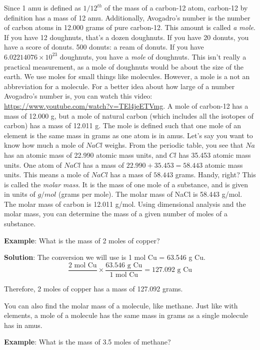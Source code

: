 Since 1 amu is defined as $1/12^{th}$ of the mass of a carbon-12 atom, carbon-12 
by definition has a mass of 12 amu. Additionally, Avogadro's number is the number 
of carbon atoms in 12.000 grams of pure carbon-12. This amount is called \textit{a
mole}. If you have 12 doughnuts, that's a dozen doughnuts. If you have 20 donuts, 
you have a score of donuts. 500 donuts: a ream of donuts. If you have $6.02214076 
\times 10^{23}$ doughnuts, you have a \textit{mole} of doughnuts. This isn't 
really a practical measurement, as a mole of doughnuts would be about the size of 
the earth. We use moles for small things like molecules. However, a mole is a not an abbreviation for a molecule. For a better 
idea about how large of a number Avogadro's number is, you can watch this video: 
\url{https://www.youtube.com/watch?v=TEl4jeETVmg}. 
A mole of carbon-12 has a mass of 12.000 g, but a mole of natural carbon (which
includes all the isotopes of carbon) has a mass of 12.011 g. The mole is defined 
such that one mole of an element is the same mass in grams as one atom is in amus.
Let's say you want to know how much a mole of $NaCl$ weighs. From the periodic 
table, you see that $Na$ has an atomic mass of 22.990 atomic mass units, and $Cl$ 
has 35.453 atomic mass units. One atom of $NaCl$ has a mass of $22.990 + 35.453 = 
58.443$ atomic mass units. This means a mole of $NaCl$ has a mass of $58.443$ 
grams. Handy, right? This is called the \textit{molar mass}. It is the mass of one
mole of a substance, and is given in units of $g/mol$ (grams per mole). The molar 
mass of NaCl is 58.443 g/mol. The molar mass of carbon is 12.011 g/mol. Using 
dimensional analysis and the molar mass, you can determine the mass of a given 
number of moles of a substance. 

\textbf{Example}: What is the mass of 2 moles of copper?

\textbf{Solution}: The conversion we will use is 1 mol Cu = 63.546 g Cu.
$$\frac{2 \text{ mol Cu}}{} \times \frac{63.546\text{ g Cu}}{1\text{ mol Cu}} = 
127.092\text{ g Cu}$$

Therefore, 2 moles of copper has a mass of 127.092 grams. 

You can also find the molar mass of a molecule, like methane. Just like with 
elements, a mole of a molecule has the same mass in grams as a single molecule has
in amus. 

\textbf{Example}: What is the mass of 3.5 moles of methane?

